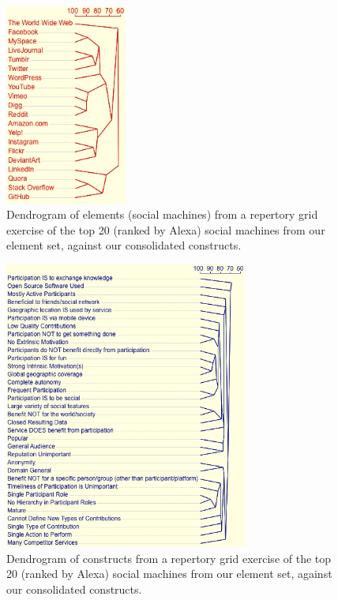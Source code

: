 \documentclass{sig-alternate}
\begin{document}
\begin{figure}[htb]
\begin{center}
\includegraphics[width=4cm]{img/dendrogram-elements.png}
\caption{Dendrogram of elements (social machines) from a repertory grid exercise of the top 20 (ranked by Alexa) social machines from our element set, against our consolidated constructs.} \label{dendrogram}
\end{center}
\end{figure}

\begin{figure}[htb]
\begin{center}
\includegraphics[width=8cm]{img/dendrogram-constructs.png}
\caption{Dendrogram of constructs from a repertory grid exercise of the top 20 (ranked by Alexa) social machines from our element set, against our consolidated constructs.} \label{dendrogram}
\end{center}
\end{figure}
\end{document}
